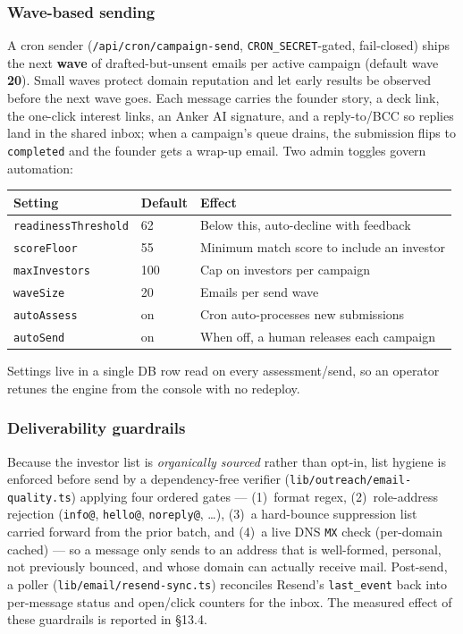 \documentclass[11pt]{article}
\begin{document}
\subsubsection{Wave-based sending}
A cron sender (\texttt{/api/cron/campaign-send}, \texttt{CRON\_SECRET}-gated,
fail-closed) ships the next \textbf{wave} of drafted-but-unsent emails per active
campaign (default wave \textbf{20}). Small waves protect domain reputation and let
early results be observed before the next wave goes. Each message carries the
founder story, a deck link, the one-click interest links, an Anker AI signature,
and a reply-to/BCC so replies land in the shared inbox; when a campaign's queue
drains, the submission flips to \texttt{completed} and the founder gets a wrap-up
email. Two admin toggles govern automation:
\begin{center}\small
\begin{tabular}{@{}lll@{}}
\toprule
\textbf{Setting} & \textbf{Default} & \textbf{Effect}\\
\midrule
\texttt{readinessThreshold} & 62 & Below this, auto-decline with feedback\\
\texttt{scoreFloor} & 55 & Minimum match score to include an investor\\
\texttt{maxInvestors} & 100 & Cap on investors per campaign\\
\texttt{waveSize} & 20 & Emails per send wave\\
\texttt{autoAssess} & on & Cron auto-processes new submissions\\
\texttt{autoSend} & on & When off, a human releases each campaign\\
\bottomrule
\end{tabular}
\end{center}
Settings live in a single DB row read on every assessment/send, so an operator
retunes the engine from the console with no redeploy.

\subsubsection{Deliverability guardrails}
Because the investor list is \emph{organically sourced} rather than opt-in, list
hygiene is enforced before send by a dependency-free verifier
(\texttt{lib/outreach/email-quality.ts}) applying four ordered gates ---
(1)~format regex, (2)~role-address rejection (\texttt{info@}, \texttt{hello@},
\texttt{noreply@}, \ldots), (3)~a hard-bounce suppression list carried forward
from the prior batch, and (4)~a live DNS \texttt{MX} check (per-domain cached) ---
so a message only sends to an address that is well-formed, personal, not
previously bounced, and whose domain can actually receive mail. Post-send, a
poller (\texttt{lib/email/resend-sync.ts}) reconciles Resend's \texttt{last\_event}
back into per-message status and open/click counters for the inbox. The measured
effect of these guardrails is reported in \S13.4.
\end{document}
